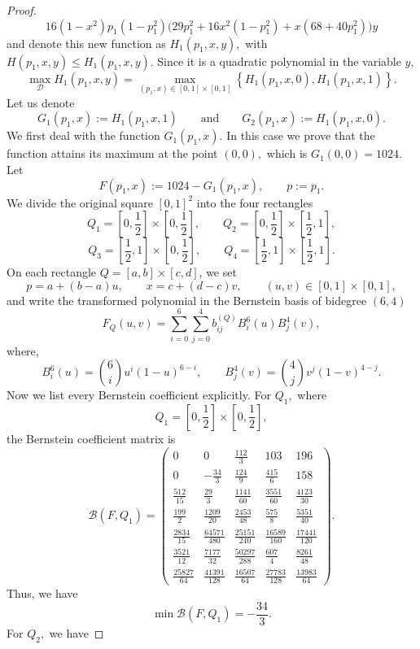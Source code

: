 \documentclass[a4paper,12pt,reqno]{amsart} %
\numberwithin{equation}{section}
\theoremstyle{definition}
\begin{document}
\begin{proof}
\[
16(1-x^2)p_1(1-p_1^2)\bigl(29p_1^2+16x^2(1-p_1^2)+x(68+40p_1^2)\bigr)y
\]
and denote this new function as $H_{1}(p_1, x, y),$ with $H(p_1, x, y)\le H_{1}(p_1, x, y).$ Since it is a quadratic polynomial in the variable $y,$ 
\[
\max_{\mathcal{D}}H_{1}(p_1, x, y)=\max_{(p_{1},x)\in [0, 1]\times[0, 1]}\left\{H_{1}(p_1, x, 0), H_{1}(p_1, x, 1)\right\}.
\]
Let us denote
\[
G_{1}(p_1, x):= H_{1}(p_1, x, 1)
\qquad\text{and}\qquad
G_{2}(p_1, x):= H_{1}(p_1, x, 0).
\]
We first deal with the function $G_{1}(p_1, x).$ In this case we prove that the function attains its maximum at the point $(0, 0),$ which is $G_{1}(0, 0)=1024$.\\[2mm]
Let
\[
F(p_1,x):=1024-G_1(p_1,x),
\qquad p:=p_1.
\]
We divide the original square \([0,1]^2\) into the four rectangles
\[
Q_1=\left[0,\frac12\right]\times\left[0,\frac12\right],\qquad
Q_2=\left[0,\frac12\right]\times\left[\frac12,1\right],
\]
\[
Q_3=\left[\frac12,1\right]\times\left[0,\frac12\right],\qquad
Q_4=\left[\frac12,1\right]\times\left[\frac12,1\right].
\]
On each rectangle \(Q=[a,b]\times[c,d]\), we set
\[
p=a+(b-a)u,\qquad x=c+(d-c)v,\qquad (u,v)\in[0,1]\times[0, 1],
\]
and write the transformed polynomial in the Bernstein basis of bidegree $(6,4)$
\[
F_Q(u,v)=\sum_{i=0}^{6}\sum_{j=0}^{4} b^{(Q)}_{ij} B_i^6(u)B_j^4(v),
\]
where,
\[
B_i^6(u)=\binom{6}{i}u^i(1-u)^{6-i},
\qquad
B_j^4(v)=\binom{4}{j}v^j(1-v)^{4-j}.
\]
Now we list every Bernstein coefficient explicitly.
For $Q_{1},$ where
\[
Q_1=\left[0,\frac12\right]\times\left[0,\frac12\right],
\]
the Bernstein coefficient matrix is
\[
\mathcal B(F,Q_1)=
\begin{pmatrix}
	0 & 0 & \frac{112}{3} & 103 & 196\\[5mm]
	0 & -\frac{34}{3} & \frac{124}{9} & \frac{415}{6} & 158\\[5mm]
	\frac{512}{15} & \frac{29}{3} & \frac{1141}{60} & \frac{3551}{60} & \frac{4123}{30}\\[5mm]
	\frac{199}{2} & \frac{1209}{20} & \frac{2453}{48} & \frac{575}{8} & \frac{5351}{40}\\[5mm]
	\frac{2834}{15} & \frac{64571}{480} & \frac{25151}{240} & \frac{16589}{160} & \frac{17441}{120}\\[5mm]
	\frac{3521}{12} & \frac{7177}{32} & \frac{50297}{288} & \frac{607}{4} & \frac{8261}{48}\\[5mm]
	\frac{25827}{64} & \frac{41391}{128} & \frac{16507}{64} & \frac{27783}{128} & \frac{13983}{64}
\end{pmatrix}.
\]
Thus, we have 
\[
\min \mathcal B(F,Q_1)=-\frac{34}{3}.
\]
For $Q_{2},$ we have

\end{proof}
\end{document}
